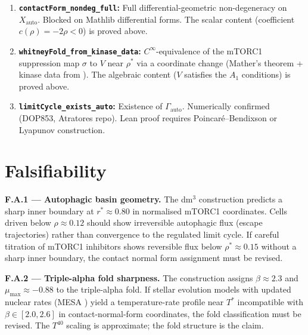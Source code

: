 \documentclass[12pt,a4paper]{article}
\begin{document}
\begin{enumerate}[label=\Alph*.,leftmargin=2em]
  \item \textbf{\texttt{contactForm\_nondeg\_full}:}
    Full differential-geometric non-degeneracy on $X_\mathrm{auto}$.
    Blocked on Mathlib differential forms.
    The scalar content (coefficient $c(\rho) = -2\rho < 0$) is proved
    above.

  \item \textbf{\texttt{whitneyFold\_from\_kinase\_data}:}
    $C^\infty$-equivalence of the mTORC1 suppression map $\sigma$ to
    $V$ near $\rho^*$ via a coordinate change (Mather's theorem
    + kinase data from \cite{Mizushima2010}).
    The algebraic content ($V$ satisfies the $A_1$ conditions) is
    proved above.

  \item \textbf{\texttt{limitCycle\_exists\_auto}:}
    Existence of $\Gamma_\mathrm{auto}$.
    Numerically confirmed (DOP853, Atratores repo).
    Lean proof requires Poincar\'e--Bendixson or Lyapunov construction.
\end{enumerate}

\section{Falsifiability}
\label{sec:falsif}

\textbf{F.A.1 --- Autophagic basin geometry.}
The dm$^3$ construction predicts a sharp inner boundary at
$r^* \approx 0.80$ in normalised mTORC1 coordinates.
Cells driven below $\rho \approx 0.12$ should show irreversible
autophagic flux (escape trajectories) rather than convergence to
the regulated limit cycle.
If careful titration of mTORC1 inhibitors shows reversible flux below
$\rho^* \approx 0.15$ without a sharp inner boundary, the contact
normal form assignment must be revised.

\textbf{F.A.2 --- Triple-alpha fold sharpness.}
The construction assigns $\beta \approx 2.3$ and
$\mu_{\max} \approx -0.88$ to the triple-alpha fold.
If stellar evolution models with updated nuclear rates
(MESA \cite{Paxton2011}) yield a temperature-rate profile near $T^*$
incompatible with $\beta \in [2.0, 2.6]$ in contact-normal-form
coordinates, the fold classification must be revised.
The $T^{40}$ scaling is approximate; the fold structure is the claim.

\end{document}
